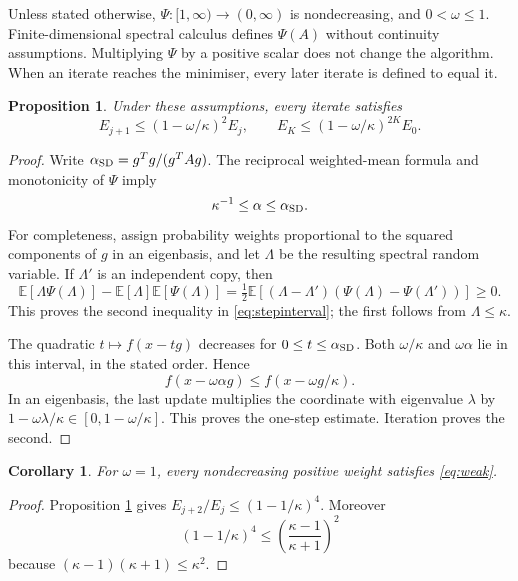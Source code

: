 \documentclass[11pt,a4paper]{article}
\newtheorem{proposition}[theorem]{Proposition}
\newtheorem{corollary}[theorem]{Corollary}
\theoremstyle{remark}
\newcommand{\E}{\mathbb E}
\begin{document}
Unless stated otherwise, $\Psi:[1,\infty)\to(0,\infty)$ is nondecreasing, and $0<\omega\le1$. Finite-dimensional spectral calculus defines $\Psi(A)$ without continuity assumptions. Multiplying $\Psi$ by a positive scalar does not change the algorithm. When an iterate reaches the minimiser, every later iterate is defined to equal it.

\begin{proposition}\label{prop:upper}
Under these assumptions, every iterate satisfies
\begin{equation}\label{eq:upper}
 E_{j+1}\le(1-\omega/\kappa)^2 E_j,
 \qquad E_K\le(1-\omega/\kappa)^{2K}E_0.
\end{equation}
\end{proposition}
\begin{proof}
Write $\alpha_{\rm SD}=g^Tg/(g^TAg)$. The reciprocal weighted-mean formula and monotonicity of $\Psi$ imply
\begin{equation}\label{eq:stepinterval}
 \kappa^{-1}\le\alpha\le\alpha_{\rm SD}.
\end{equation}
For completeness, assign probability weights proportional to the squared components of $g$ in an eigenbasis, and let $\Lambda$ be the resulting spectral random variable. If $\Lambda'$ is an independent copy, then
\[
 \E[\Lambda\Psi(\Lambda)]-\E[\Lambda]\E[\Psi(\Lambda)]
 =\tfrac12\E[(\Lambda-\Lambda')(\Psi(\Lambda)-\Psi(\Lambda'))]\ge0.
\]
This proves the second inequality in \eqref{eq:stepinterval}; the first follows from $\Lambda\le\kappa$.

The quadratic $t\mapsto f(x-tg)$ decreases for $0\le t\le\alpha_{\rm SD}$. Both $\omega/\kappa$ and $\omega\alpha$ lie in this interval, in the stated order. Hence
\[
 f(x-\omega\alpha g)\le f(x-\omega g/\kappa).
\]
In an eigenbasis, the last update multiplies the coordinate with eigenvalue $\lambda$ by $1-\omega\lambda/\kappa\in[0,1-\omega/\kappa]$. This proves the one-step estimate. Iteration proves the second.
\end{proof}

\begin{corollary}\label{cor:weak}
For $\omega=1$, every nondecreasing positive weight satisfies \eqref{eq:weak}.
\end{corollary}
\begin{proof}
Proposition \ref{prop:upper} gives $E_{j+2}/E_j\le(1-1/\kappa)^4$. Moreover
\[
 (1-1/\kappa)^4\le\left(\frac{\kappa-1}{\kappa+1}\right)^2
\]
because $(\kappa-1)(\kappa+1)\le\kappa^2$.
\end{proof}
\end{document}
